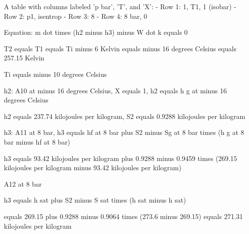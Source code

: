 A table with columns labeled 'p bar', 'T', and 'X':
- Row 1: 1, T1, 1 (isobar)
- Row 2: p1, isentrop
- Row 3: 8
- Row 4: 8 bar, 0

Equation: m dot times (h2 minus h3) minus W dot k equals 0

T2 equals T1 equals Ti minus 6 Kelvin equals minus 16 degrees Celsius equals 257.15 Kelvin

Ti equals minus 10 degrees Celsius

h2: A10 at minus 16 degrees Celsius, X equals 1, h2 equals h g at minus 16 degrees Celsius

h2 equals 237.74 kilojoules per kilogram, S2 equals 0.9288 kilojoules per kilogram

h3: A11 at 8 bar, h3 equals hf at 8 bar plus S2 minus Sg at 8 bar times (h g at 8 bar minus hf at 8 bar)

h3 equals 93.42 kilojoules per kilogram plus 0.9288 minus 0.9459 times (269.15 kilojoules per kilogram minus 93.42 kilojoules per kilogram)

A12 at 8 bar

h3 equals h sat plus S2 minus S sat times (h sat minus h sat)

equals 269.15 plus 0.9288 minus 0.9064 times (273.6 minus 269.15) equals 271.31 kilojoules per kilogram